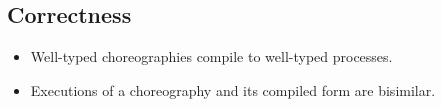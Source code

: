 \subsection{Correctness}\label{sec:correctness}

\begin{itemize}
\item Well-typed choreographies compile to well-typed processes.
\item Executions of a choreography and its compiled form are bisimilar.
\end{itemize}

